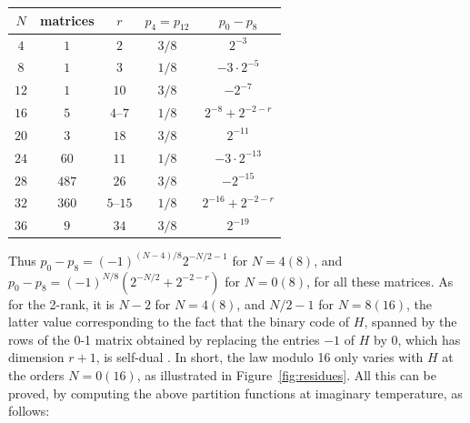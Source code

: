 \documentclass[11pt,a4paper]{article}
\theoremstyle{remark}
\begin{document}
\medskip

\begin{center}
\begin{tabular}{|c|c|c|c|c|}
\hline
$N$ & matrices & $r$ & $p_4=p_{12}$ & $p_0-p_8$\\
\hline
$4$ & $1$ & $2$ & $3/8$ & $2^{-3}$\\
$8$ & $1$ & $3$ & $1/8$ & $-3\cdot2^{-5}$\\
$12$ & $1$ & $10$ & $3/8$ & $-2^{-7}$\\
$16$ & $5$ & $4$--$7$ & $1/8$ & $2^{-8}+2^{-2-r}$\\
$20$ & $3$ & $18$ & $3/8$ & $2^{-11}$\\
$24$ & $60$ & $11$ & $1/8$ & $-3\cdot2^{-13}$\\
$28$ & $487$ & $26$ & $3/8$ & $-2^{-15}$\\
$32$ & $360$ & $5$--$15$ & $1/8$ & $2^{-16}+2^{-2-r}$\\
$36$ & $9$ & $34$ & $3/8$ & $2^{-19}$\\
\hline
\end{tabular}
\end{center}

\medskip

Thus $p_0-p_8=(-1)^{(N-4)/8}2^{-N/2-1}$ for $N=4(8)$, and $p_0-p_8=(-1)^{N/8}(2^{-N/2}+2^{-2-r})$ for $N=0(8)$, for all these matrices. As for the 2-rank, it is $N-2$ for $N=4(8)$, and $N/2-1$ for $N=8(16)$, the latter value corresponding to the fact that the binary code of $H$, spanned by the rows of the 0-1 matrix obtained by replacing the entries $-1$ of $H$ by 0, which has dimension $r+1$, is self-dual \cite{hcb}. In short, the law modulo 16 only varies with $H$ at the orders $N=0(16)$, as illustrated in Figure~\ref{fig:residues}. All this can be proved, by computing the above partition functions at imaginary temperature, as follows:
\end{document}
